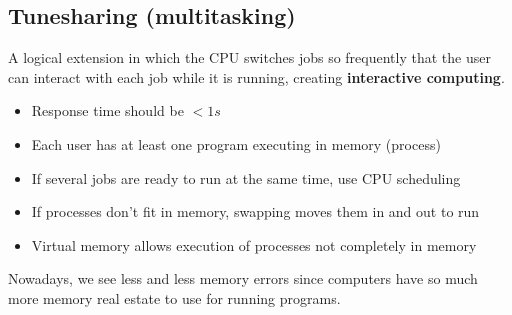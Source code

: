 \documentclass[12pt]{book}
\begin{document}
\subsection*{Tunesharing (multitasking)}
A logical extension in which the CPU switches jobs so frequently that the user can interact with each job while it is running, creating \textbf{interactive computing}.

\begin{itemize}
    \item Response time should be $<1s$
    \item Each user has at least one program executing in memory (process)
    \item If several jobs are ready to run at the same time, use CPU scheduling
    \item If processes don't fit in memory, swapping moves them in and out to run
    \item Virtual memory allows execution of processes not completely in memory
\end{itemize}

Nowadays, we see less and less memory errors since computers have so much more memory real estate to use for running programs.
\end{document}

